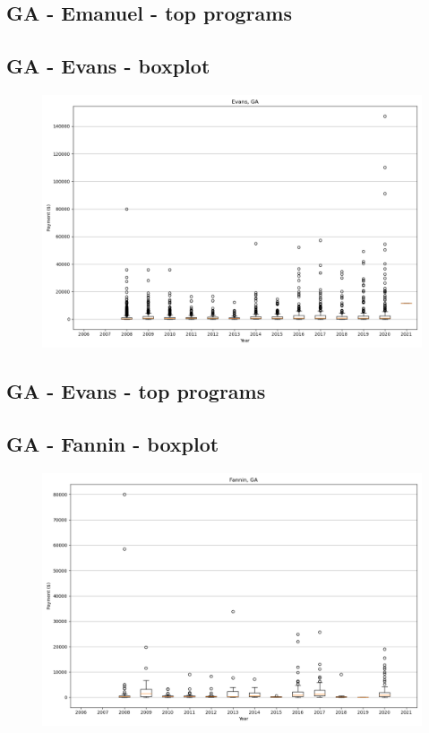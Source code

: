 \subsection*{GA - Emanuel - top programs}

\newpage
\subsection*{GA - Evans - boxplot}
\begin{figure}[h]
\centering
\includegraphics[width=7in]{../output/boxplots/counties/Evans-GA_boxplot.png}
\end{figure}


\subsection*{GA - Evans - top programs}

\newpage
\subsection*{GA - Fannin - boxplot}
\begin{figure}[h]
\centering
\includegraphics[width=7in]{../output/boxplots/counties/Fannin-GA_boxplot.png}
\end{figure}


